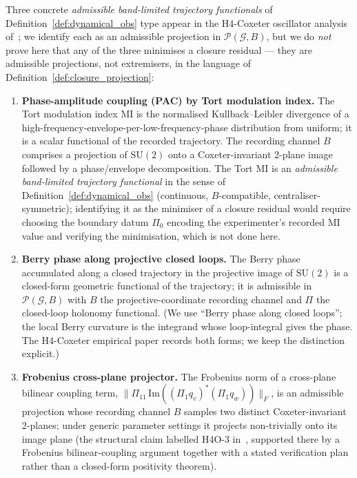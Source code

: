\documentclass[12pt]{article}
\newcommand{\Pcal}{\mathcal{P}}
\newcommand{\Gcal}{\mathcal{G}}
\begin{document}
Three concrete \emph{admissible band-limited trajectory functionals} of Definition~\ref{def:dynamical_obs} type appear in the H4-Coxeter oscillator analysis of~\citep{H4Coxeter2026}; we identify each as an admissible projection in $\Pcal(\Gcal, B)$, but we do \emph{not} prove here that any of the three minimises a closure residual --- they are admissible projections, not extremisers, in the language of Definition~\ref{def:closure_projection}:

\begin{enumerate}
    \item \textbf{Phase-amplitude coupling (PAC) by Tort modulation index.} The Tort modulation index $\mathrm{MI}$ is the normalised Kullback--Leibler divergence of a high-frequency-envelope-per-low-frequency-phase distribution from uniform; it is a scalar functional of the recorded trajectory. The recording channel $B$ comprises a projection of $\mathrm{SU}(2)$ onto a Coxeter-invariant 2-plane image followed by a phase/envelope decomposition. The Tort MI is an \emph{admissible band-limited trajectory functional} in the sense of Definition~\ref{def:dynamical_obs} (continuous, $B$-compatible, centraliser-symmetric); identifying it as the minimiser of a closure residual would require choosing the boundary datum $\Pi_0$ encoding the experimenter's recorded MI value and verifying the minimisation, which is not done here.

    \item \textbf{Berry phase along projective closed loops.} The Berry phase accumulated along a closed trajectory in the projective image of $\mathrm{SU}(2)$ is a closed-form geometric functional of the trajectory; it is admissible in $\Pcal(\Gcal, B)$ with $B$ the projective-coordinate recording channel and $\Pi$ the closed-loop holonomy functional. (We use ``Berry phase along closed loops''; the local Berry curvature is the integrand whose loop-integral gives the phase. The H4-Coxeter empirical paper records both forms; we keep the distinction explicit.)

    \item \textbf{Frobenius cross-plane projector.} The Frobenius norm of a cross-plane bilinear coupling term, $\|\Pi_{11}\,\mathrm{Im}((\Pi_1 q_v)^*(\Pi_1 q_w))\|_F$, is an admissible projection whose recording channel $B$ samples two distinct Coxeter-invariant 2-planes; under generic parameter settings it projects non-trivially onto its image plane (the structural claim labelled H4O-3 in~\citep{H4Coxeter2026}, supported there by a Frobenius bilinear-coupling argument together with a stated verification plan rather than a closed-form positivity theorem).
\end{enumerate}
\end{document}
